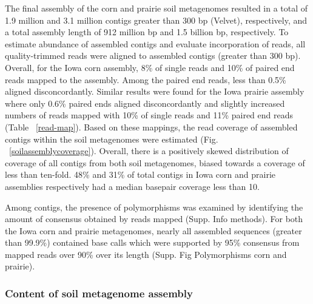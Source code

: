 \documentclass[11pt]{article} %
\begin{document}
The final assembly of the corn and prairie soil metagenomes resulted
in a total of 1.9 million and 3.1 million contigs greater than 300 bp (Velvet),
respectively, and a total assembly length of 912 million bp and 1.5
billion bp, respectively.  To estimate abundance of assembled contigs
and evaluate incorporation of reads, all quality-trimmed reads were
aligned to assembled contigs (greater than 300 bp).  Overall, for the
Iowa corn assembly, 8\% of single reads and 10\% of paired end reads
mapped to the assembly.  Among the paired end reads, less than 0.5\%
aligned disconcordantly.  Similar results were found for the Iowa
prairie assembly where only 0.6\% paired ends aligned disconcordantly
and slightly increased numbers of reads mapped with 10\% of single
reads and 11\% paired end reads (Table ~\ref{read-map}).  Based on
these mappings, the read coverage of assembled contigs within the soil
metagenomes were estimated (Fig. ~\ref{soilassemblycoverage}).
Overall, there is a positively skewed distribution of coverage of all
contigs from both soil metagenomes, biased towards a coverage of less
than ten-fold.  48\% and 31\% of total contigs in Iowa corn and prairie
assemblies respectively had a median basepair coverage less than
10.

Among contigs, the presence of polymorphisms was examined by
identifying the amount of consensus obtained by reads mapped
(Supp. Info methods).  For both the Iowa corn and prairie metagenomes,
nearly all assembled sequences (greater than 99.9\%) contained base
calls which were supported by 95\% consensus from mapped reads over
90\% over its length (Supp. Fig Polymorphisms corn and prairie).



\subsubsection{Content of soil metagenome assembly}

\end{document}
